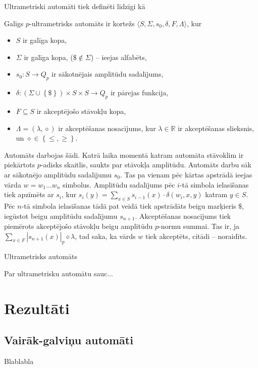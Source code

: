 \documentclass{ludis}
\begin{document}
Ultrametriski automāti tiek definēti līdzīgi kā %
\begin{definicija}
Galīgs $p$-ultrametrisks automāts ir kortežs $\langle S, \Sigma, s_0, \delta, F, \Lambda \rangle$, kur
\begin{itemize}
  \item $S$ ir galīga kopa,
  \item $\Sigma$ ir galīga kopa, ($\$ \notin \Sigma$) -- ieejas alfabēts,
  \item $s_0:S \rightarrow Q_p$ ir sākotnējais amplitūdu sadalījums,
  \item $\delta: \left( \Sigma \cup \left\{ \$ \right\} \right) \times S \times S \rightarrow Q_p$ ir pārejas funkcija,
  \item $F \subseteq S$ ir akceptējošo stāvokļu kopa,
  \item $\Lambda = \left( \lambda, \diamond \right)$ ir akceptēšanas nosacījums, kur $\lambda \in \mathbb{R}$ ir akceptēšanas slieksnis, un $\diamond \in \left\{ \leq, \geq \right\}$.
\end{itemize}
Automāts darbojas šādi. %
Katrā laika momentā katram automāta stāvoklim ir piekārtots $p$-adisks skaitlis, saukts par stāvokļa amplitūdu.
Automāts darbu sāk ar sākotnējo amplitūdu sadalījumu $s_0$.
Tas pa vienam pēc kārtas apstrādā ieejas vārda $w = w_1 \ldots w_n$ simbolus.
Amplitūdu sadalījums pēc $i$-tā simbola ielasīšanas tiek apzīmēts ar $s_i$, kur
$s_i(y) = \sum_{x \in S}{s_{i-1}(x) \cdot \delta \left( w_i, x, y \right) }$ katram $y \in S$.
Pēc $n$-tā simbola ielasīšanas tādā pat veidā tiek apstrādāts beigu marķieris $\$$, iegūstot beigu amplitūdu sadalījumu $s_{n+1}$.
Akceptēšanas nosacījums tiek piemērots akceptējošo stāvokļu beigu amplitūdu $p$-normu summai. Tas ir, ja $\sum_{x \in F}{\left| s_{n+1}(x) \right|_p} \diamond \lambda$, tad saka, ka vārds $w$ tiek akceptēts, citādi -- noraidīts.
\end{definicija}

\begin{definicija}
Ultrametrisks automāts

Par ultrametrisku automātu sauc...
\end{definicija}

\section {Rezultāti}
\subsection {Vairāk-galviņu automāti}
\begin{teorema}
Blablabla
\end{teorema}
\end{document}
